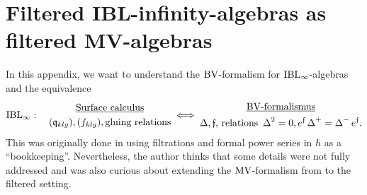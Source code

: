 \documentclass[\MainFolder/Text.tex]{subfiles}
\begin{document}
\chapter{Filtered IBL-infinity-algebras as filtered MV-algebras}\label{App:IBLMV}
In this appendix, we want to understand the $\mathrm{BV}$-formalism for $\mathrm{IBL}_\infty$-algebras and the equivalence
$$\mathrm{IBL}_\infty:\quad \begin{gathered}
\underline{\text{Surface calculus}} \\
(\mathfrak{q}_{klg}), (f_{klg}), \text{gluing relations}
\end{gathered}
\;\Longleftrightarrow\;
\begin{gathered}
\underline{\mathrm{BV}\text{-formalismus}} \\
 \operatorname{\Delta}, \mathfrak{f},\text{\,relations }\operatorname{\Delta}^2 = 0, e^{\mathfrak{f}} \operatorname{\Delta}^+ = \operatorname{\Delta}^- e^{\mathfrak{f}}.
\end{gathered}$$
%
This was originally done in \cite{Cieliebak2015} using filtrations and formal power series in $\hbar$ as a ``bookkeeping''. Nevertheless, the author thinks that some details were not fully addressed and was also curious about extending the $\mathrm{MV}$-formalism from \cite{Markl2015} to the filtered setting.
\end{document}
